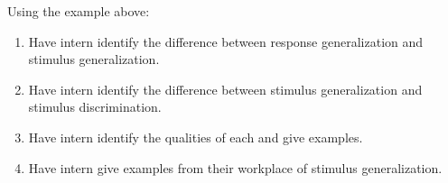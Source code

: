 %
Using the example above:
\begin{enumerate}
\item Have intern identify the difference between response generalization and stimulus generalization.
\item Have intern identify the difference between stimulus generalization and stimulus discrimination. 
\item Have intern identify the qualities of each and give examples.
\item Have intern give examples from their workplace of stimulus generalization.
\end{enumerate}